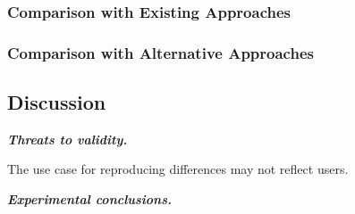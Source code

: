 \subsubsection{Comparison with Existing Approaches}
\label{sec:existing}


\subsubsection{Comparison with Alternative Approaches}
\label{sec:alternative}


\subsection{Discussion}

\noindent \textbf{\textit{Threats to validity.}}

\vspace{1mm}
The use case for reproducing differences may not reflect
users.

\noindent \textbf{\textit{Experimental conclusions.}}

